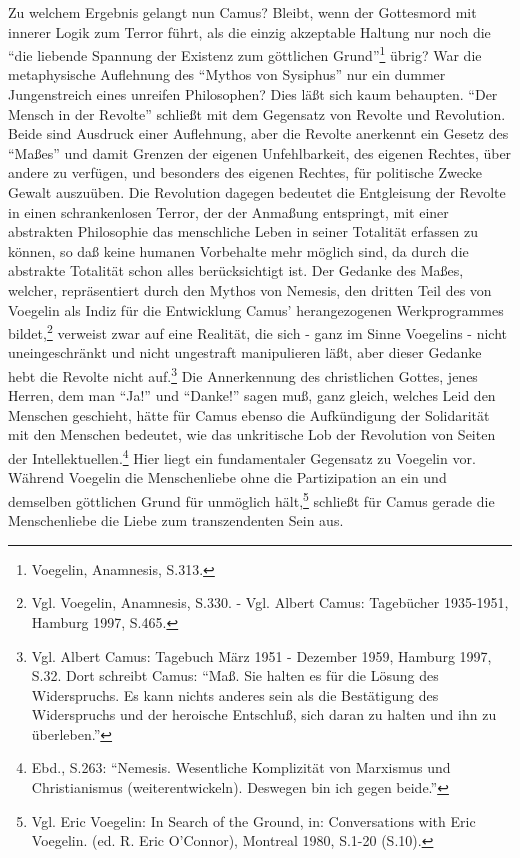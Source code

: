 Zu welchem Ergebnis gelangt nun Camus? Bleibt, wenn der Gottesmord mit
innerer Logik zum Terror führt, als die einzig akzeptable Haltung nur
noch die "`die liebende Spannung der Existenz zum göttlichen
Grund"'\footnote{Voegelin, Anamnesis, S.313.} übrig? War die
metaphysische Auflehnung des "`Mythos von Sysiphus"' nur ein dummer
Jungenstreich eines unreifen Philosophen? Dies läßt sich kaum behaupten.
"`Der Mensch in der Revolte"' schließt mit dem Gegensatz von Revolte und
Revolution. Beide sind Ausdruck einer Auflehnung, aber die Revolte
anerkennt ein Gesetz des "`Maßes"' und damit Grenzen der eigenen
Unfehlbarkeit, des eigenen Rechtes, über andere zu verfügen, und
besonders des eigenen Rechtes, für politische Zwecke Gewalt auszuüben.
Die Revolution dagegen bedeutet die Entgleisung der Revolte in einen
schrankenlosen Terror, der der Anmaßung entspringt, mit einer abstrakten
Philosophie das menschliche Leben in seiner Totalität erfassen zu
können, so daß keine humanen Vorbehalte mehr möglich sind, da durch die
abstrakte Totalität schon alles berücksichtigt ist. Der Gedanke des
Maßes, welcher, repräsentiert durch den Mythos von Nemesis, den dritten
Teil des von Voegelin als Indiz für die Entwicklung Camus'
herangezogenen Werkprogrammes bildet,\footnote{Vgl. Voegelin, Anamnesis,
  S.330. - Vgl.  Albert Camus: Tagebücher 1935-1951, Hamburg 1997,
  S.465.}  verweist zwar auf eine Realität, die sich - ganz im Sinne
Voegelins - nicht uneingeschränkt und nicht ungestraft manipulieren
läßt, aber dieser Gedanke hebt die Revolte nicht auf.\footnote{Vgl.
  Albert Camus: Tagebuch März 1951 - Dezember 1959, Hamburg 1997, S.32.
  Dort schreibt Camus: "`Maß. Sie halten es für die Lösung des
  Widerspruchs. Es kann nichts anderes sein als die Bestätigung des
  Widerspruchs und der heroische Entschluß, sich daran zu halten und ihn
  zu überleben."'} Die Annerkennung des christlichen Gottes, jenes
Herren, dem man "`Ja!"' und "`Danke!"' sagen muß, ganz gleich, welches
Leid den Menschen geschieht, hätte für Camus ebenso die Aufkündigung der
Solidarität mit den Menschen bedeutet, wie das unkritische Lob der
Revolution von Seiten der Intellektuellen.\footnote{Ebd., S.263:
  "`Nemesis.  Wesentliche Komplizität von Marxismus und Christianismus
  (weiterentwickeln).  Deswegen bin ich gegen beide."'} Hier liegt ein
fundamentaler Gegensatz zu Voegelin vor. Während Voegelin die
Menschenliebe ohne die Partizipation an ein und demselben göttlichen
Grund für unmöglich hält,\footnote{Vgl. Eric Voegelin: In Search of the
  Ground, in: Conversations with Eric Voegelin.  (ed. R. Eric O'Connor),
  Montreal 1980, S.1-20 (S.10).}  schließt für Camus gerade die
Menschenliebe die Liebe zum transzendenten Sein aus.


